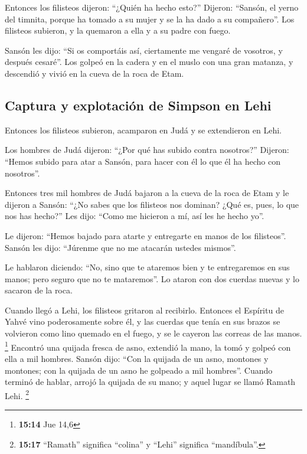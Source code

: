 \begin{paracol}{2}
 Entonces los filisteos dijeron: ``¿Quién ha hecho esto?''
Dijeron: ``Sansón, el yerno del timnita, porque ha tomado a su mujer y
se la ha dado a su compañero''. Los filisteos subieron, y la quemaron a
ella y a su padre con fuego.

 Sansón les dijo: ``Si os comportáis así, ciertamente me
vengaré de vosotros, y después cesaré''.  Los golpeó en la
cadera y en el muslo con una gran matanza, y descendió y vivió en la
cueva de la roca de Etam.

\hypertarget{captura-y-explotaciuxf3n-de-simpson-en-lehi}{%
\subsection{Captura y explotación de Simpson en
Lehi}\label{captura-y-explotaciuxf3n-de-simpson-en-lehi}}

 Entonces los filisteos subieron, acamparon en Judá y se
extendieron en Lehi.

 Los hombres de Judá dijeron: ``¿Por qué has subido
contra nosotros?'' Dijeron: ``Hemos subido para atar a Sansón, para
hacer con él lo que él ha hecho con nosotros''.

 Entonces tres mil hombres de Judá bajaron a la cueva de
la roca de Etam y le dijeron a Sansón: ``¿No sabes que los filisteos nos
dominan? ¿Qué es, pues, lo que nos has hecho?'' Les dijo: ``Como me
hicieron a mí, así les he hecho yo''.

 Le dijeron: ``Hemos bajado para atarte y entregarte en
manos de los filisteos''. Sansón les dijo: ``Júrenme que no me atacarán
ustedes mismos''.

 Le hablaron diciendo: ``No, sino que te ataremos bien y
te entregaremos en sus manos; pero seguro que no te mataremos''. Lo
ataron con dos cuerdas nuevas y lo sacaron de la roca.

 Cuando llegó a Lehi, los filisteos gritaron al
recibirlo. Entonces el Espíritu de Yahvé vino poderosamente sobre él, y
las cuerdas que tenía en sus brazos se volvieron como lino quemado en el
fuego, y se le cayeron las correas de las manos. \footnote{\textbf{15:14}
  Jue 14,6}  Encontró una quijada fresca de asno,
extendió la mano, la tomó y golpeó con ella a mil hombres.
 Sansón dijo: ``Con la quijada de un asno, montones y
montones; con la quijada de un asno he golpeado a mil hombres''.
 Cuando terminó de hablar, arrojó la quijada de su mano;
y aquel lugar se llamó Ramath Lehi. \footnote{\textbf{15:17} ``Ramath''
  significa ``colina'' y ``Lehi'' significa ``mandíbula''.}


\end{paracol}
